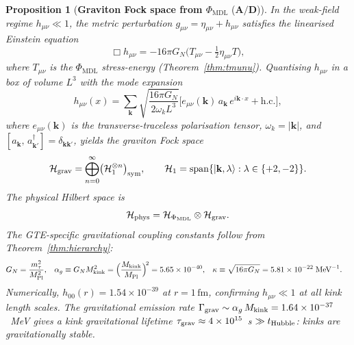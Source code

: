 \documentclass[11pt]{article}
\newtheorem{proposition}[theorem]{Proposition}
\theoremstyle{remark}
\newcommand{\PHIMDL}{\Phi_{\mathrm{MDL}}}
\newcommand{\CatAD}{\textbf{A/D}}
\begin{document}
\begin{proposition}[\textbf{Graviton Fock space from $\PHIMDL$} ($\CatAD$)]
\label{prop:graviton_fock}
In the weak-field regime $h_{\mu\nu}\ll 1$, the metric perturbation
$g_{\mu\nu}=\eta_{\mu\nu}+h_{\mu\nu}$ satisfies the linearised Einstein equation
\begin{equation}
  \Box h_{\mu\nu} = -16\pi G_N\bigl(T_{\mu\nu}-\tfrac{1}{2}\eta_{\mu\nu}T\bigr),
  \label{eq:lin_einstein}
\end{equation}
where $T_{\mu\nu}$ is the $\PHIMDL$ stress-energy (Theorem~\ref{thm:tmunu}).
Quantising $h_{\mu\nu}$ in a box of volume $L^3$ with the mode expansion
\begin{equation}
  h_{\mu\nu}(x)
  = \sum_{\mathbf{k}}
    \sqrt{\frac{16\pi G_N}{2\omega_k L^3}}
    \bigl[e_{\mu\nu}(\mathbf{k})\,a_{\mathbf{k}}\,e^{i\mathbf{k}\cdot x}
          +\mathrm{h.c.}\bigr],
  \label{eq:graviton_mode}
\end{equation}
where $e_{\mu\nu}(\mathbf{k})$ is the transverse-traceless polarisation tensor,
$\omega_k = |\mathbf{k}|$, and $[a_{\mathbf{k}},\,a_{\mathbf{k}'}^\dagger]=
\delta_{\mathbf{k}\mathbf{k}'}$, yields the \emph{graviton Fock space}
\begin{equation}
  \mathcal{H}_{\rm grav}
  = \bigoplus_{n=0}^{\infty}\bigl(\mathcal{H}_1^{\otimes n}\bigr)_{\rm sym},
  \qquad
  \mathcal{H}_1 = \mathrm{span}\{|\mathbf{k},\lambda\rangle:\lambda\in\{+2,-2\}\}.
  \label{eq:grav_fock}
\end{equation}
The physical Hilbert space is
\begin{equation}
  \mathcal{H}_{\rm phys} = \mathcal{H}_{\PHIMDL}\otimes\mathcal{H}_{\rm grav}.
  \label{eq:phys_hilbert}
\end{equation}
The GTE-specific gravitational coupling constants follow from
Theorem~\ref{thm:hierarchy}:
\begin{align}
  G_N &= \frac{m_\tau^2}{M_{\rm Pl}^2},
  &
  \alpha_g &\equiv G_N M_{\rm kink}^2
  = \Bigl(\frac{M_{\rm kink}}{M_{\rm Pl}}\Bigr)^{\!2}
  = 5.65\times10^{-40},
  &
  \kappa &\equiv \sqrt{16\pi G_N}
  = 5.81\times10^{-22}\;\text{MeV}^{-1}.
  \label{eq:grav_couplings}
\end{align}
Numerically, $h_{00}(r) = 1.54\times10^{-39}$ at $r=1\,\text{fm}$,
confirming $h_{\mu\nu}\ll 1$ at all kink length scales.
The gravitational emission rate $\Gamma_{\rm grav}\sim\alpha_g\,M_{\rm kink}
= 1.64\times10^{-37}$~MeV gives a kink gravitational lifetime
$\tau_{\rm grav}\approx 4\times10^{15}$~s $\gg t_{\rm Hubble}$: kinks are
gravitationally stable.
\end{proposition}
\end{document}
